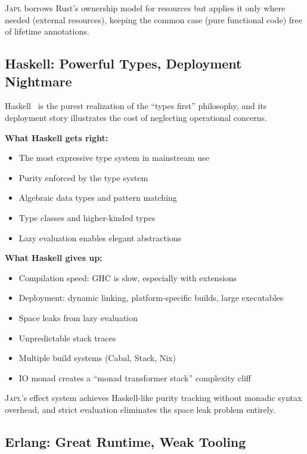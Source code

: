 \documentclass[11pt,twocolumn]{article}
\newcommand{\japl}{\textsc{Japl}}
\begin{document}
\japl{} borrows Rust's ownership model for resources but applies it only where needed (external resources), keeping the common case (pure functional code) free of lifetime annotations.

\subsection{Haskell: Powerful Types, Deployment Nightmare}

Haskell~\citep{marlow2010haskell,jones2003haskell} is the purest realization of the ``types first'' philosophy, and its deployment story illustrates the cost of neglecting operational concerns.

\textbf{What Haskell gets right:}
\begin{itemize}[leftmargin=*]
\item The most expressive type system in mainstream use
\item Purity enforced by the type system
\item Algebraic data types and pattern matching
\item Type classes and higher-kinded types
\item Lazy evaluation enables elegant abstractions
\end{itemize}

\textbf{What Haskell gives up:}
\begin{itemize}[leftmargin=*]
\item Compilation speed: GHC is slow, especially with extensions
\item Deployment: dynamic linking, platform-specific builds, large executables
\item Space leaks from lazy evaluation~\citep{mitchell2013leaking}
\item Unpredictable stack traces
\item Multiple build systems (Cabal, Stack, Nix)
\item IO monad creates a ``monad transformer stack'' complexity cliff
\end{itemize}

\japl{}'s effect system achieves Haskell-like purity tracking without monadic syntax overhead, and strict evaluation eliminates the space leak problem entirely.

\subsection{Erlang: Great Runtime, Weak Tooling}
\end{document}
